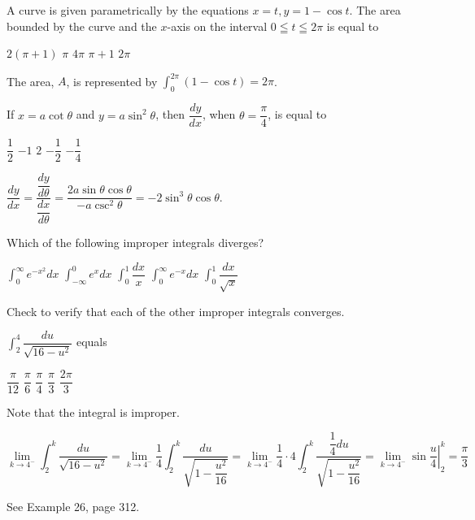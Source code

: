 \newpage





\question
A curve is given parametrically by the equations $x=t, y=1-\cos t$. The area bounded by the curve and the $x$-axis on the interval $0 \leqq t \leqq 2 \pi$ is equal to
\begin{choices}
  \choice $2(\pi+1)$
  \choice $\pi$
  \choice $4 \pi$
  \choice $\pi+1$
  \CorrectChoice $2 \pi$
\end{choices}
\begin{solution}
The area, $A$, is represented by $\displaystyle\int_{0}^{2 \pi}(1-\cos t)=2 \pi$.
\end{solution}

\question
If $x=a \cot \theta$ and $y=a \sin ^{2} \theta$, then $\dfrac{d y}{d x}$, when $\theta=\dfrac{\pi}{4}$, is equal to
\begin{choices}
  \choice $\dfrac{1}{2}$
  \choice $-1$
  \choice $2$
  \CorrectChoice $-\dfrac{1}{2}$
  \choice $-\dfrac{1}{4}$
\end{choices}
\begin{solution}
$\dfrac{d y}{d x}=\dfrac{\dfrac{d y}{d \theta}}{\dfrac{d x}{d \theta}}=\dfrac{2 a \sin \theta \cos \theta}{-a \csc ^{2} \theta}=-2 \sin ^{3} \theta \cos \theta$.
\end{solution}

\question
Which of the following improper integrals diverges?
\begin{choices}
  \choice $\displaystyle\int_{0}^{\infty} e^{-x^{2}} d x$
  \choice $\displaystyle\int_{-\infty}^{0} e^{x} d x$
  \CorrectChoice $\displaystyle\int_{0}^{1} \dfrac{d x}{x}$
  \choice $\displaystyle\int_{0}^{\infty} e^{-x} d x$
  \choice $\displaystyle\int_{0}^{1} \dfrac{d x}{\sqrt{x}}$
\end{choices}
\begin{solution}
Check to verify that each of the other improper integrals converges.
\end{solution}





\newpage





\question
$\displaystyle\int_{2}^{4} \dfrac{d u}{\sqrt{16-u^{2}}}$ equals
\begin{choices}
  \choice $\dfrac{\pi}{12}$
  \choice $\dfrac{\pi}{6}$
  \choice $\dfrac{\pi}{4}$
  \CorrectChoice $\dfrac{\pi}{3}$
  \choice $\dfrac{2 \pi}{3}$
\end{choices}
\begin{solution}
Note that the integral is improper.


\[
\lim\limits_{k \to 4^{-}} \displaystyle\int_{2}^{k} \dfrac{d u}{\sqrt{16-u^{2}}}=\lim\limits_{k \to 4^{-}} \dfrac{1}{4} \displaystyle\int_{2}^{k} \dfrac{d u}{\sqrt{1-\dfrac{u^{2}}{16}}}=\lim\limits_{k \to 4^{-}} \dfrac{1}{4} \cdot 4 \displaystyle\int_{2}^{k} \dfrac{\dfrac{1}{4} d u}{\sqrt{1-\dfrac{u^{2}}{16}}}=\left.\lim\limits_{k \to 4^{-}} \sin \dfrac{u}{4}\right|_{2} ^{k}=\dfrac{\pi}{3}
\]

See Example 26, page 312.
\end{solution}

